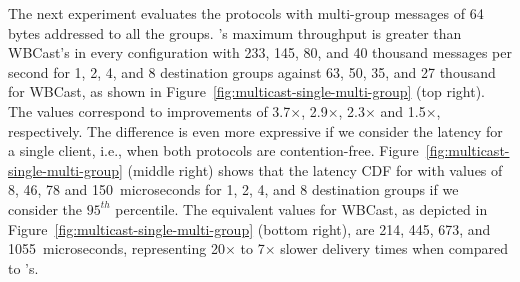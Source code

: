 The next experiment evaluates the protocols with multi-group messages of 64 bytes addressed to all the groups.
\libname's maximum throughput is greater than WBCast's in every configuration with 233, 145, 80, and 40 thousand messages per second for 1, 2, 4, and 8 destination groups against 63, 50, 35, and 27 thousand for WBCast, as shown in Figure~\ref{fig:multicast-single-multi-group} (top right).
The values correspond to improvements of 3.7$\times$, 2.9$\times$, 2.3$\times$ and 1.5$\times$, respectively.
The difference is even more expressive if we consider the latency for a single client, i.e., when both protocols are contention-free. Figure~\ref{fig:multicast-single-multi-group} (middle right) shows that the latency CDF for \libname with values of 8, 46, 78 and 150~microseconds for 1, 2, 4, and 8 destination groups if we consider the $95^{th}$ percentile. 
The equivalent values for WBCast, as depicted in Figure~\ref{fig:multicast-single-multi-group} (bottom right), are 214, 445, 673, and 1055~microseconds, representing 20$\times$ to 7$\times$ slower delivery times when compared to \libname's.


